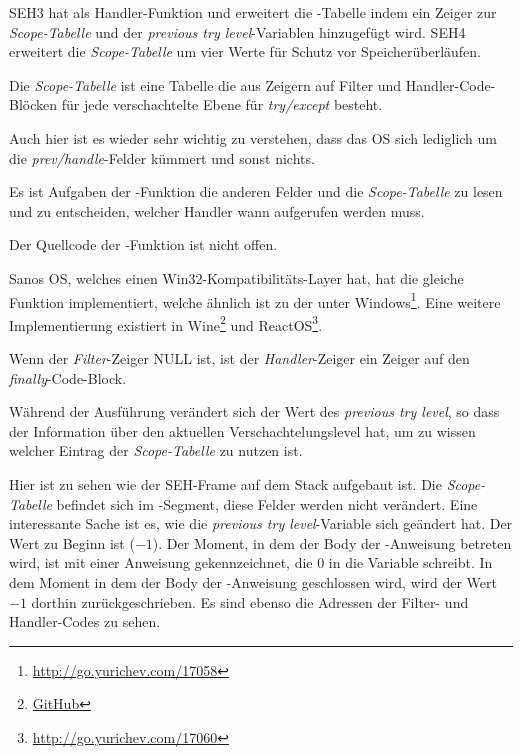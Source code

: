 
SEH3 hat  als Handler-Funktion und erweitert die
-Tabelle indem ein Zeiger zur \emph{Scope-Tabelle} und
der \emph{previous try level}-Variablen hinzugefügt wird.
SEH4 erweitert die \emph{Scope-Tabelle} um vier Werte für Schutz vor Speicherüberläufen.

Die \emph{Scope-Tabelle} ist eine Tabelle die aus Zeigern auf Filter und Handler-Code-Blöcken
für jede verschachtelte Ebene für \emph{try/except} besteht.



Auch hier ist es wieder sehr wichtig zu verstehen, dass das \ac{OS} sich lediglich
um die \emph{prev/handle}-Felder kümmert und sonst nichts.

Es ist Aufgaben der -Funktion die anderen Felder und die
\emph{Scope-Tabelle} zu lesen und zu entscheiden, welcher Handler wann aufgerufen
werden muss.

Der Quellcode der -Funktion ist nicht offen.

Sanos OS, welches einen Win32-Kompatibilitäts-Layer hat, hat die gleiche Funktion
implementiert, welche ähnlich ist zu der unter Windows\footnote{\url{http://go.yurichev.com/17058}}.
Eine weitere Implementierung existiert in Wine\footnote{\href{http://go.yurichev.com/17059}{GitHub}}
und ReactOS\footnote{\url{http://go.yurichev.com/17060}}.

Wenn der \emph{Filter}-Zeiger NULL ist, ist der \emph{Handler}-Zeiger ein Zeiger auf
den \emph{finally}-Code-Block.

Während der Ausführung verändert sich der Wert des \emph{previous try level}, so dass
der  Information über den aktuellen Verschachtelungslevel
hat, um zu wissen welcher Eintrag der \emph{Scope-Tabelle} zu nutzen ist.






Hier ist zu sehen wie der SEH-Frame auf dem Stack aufgebaut ist.
Die \emph{Scope-Tabelle} befindet sich im -Segment, diese Felder werden
nicht verändert.
Eine interessante Sache ist es, wie die \emph{previous try level}-Variable sich geändert hat.
Der Wert zu Beginn ist  ($-1$).
Der Moment, in dem der Body der -Anweisung betreten wird, ist mit einer Anweisung
gekennzeichnet, die 0 in die Variable schreibt.
In dem Moment in dem der Body der -Anweisung geschlossen wird, wird der Wert $-1$
dorthin zurückgeschrieben.
Es sind ebenso die Adressen der Filter- und Handler-Codes zu sehen.

